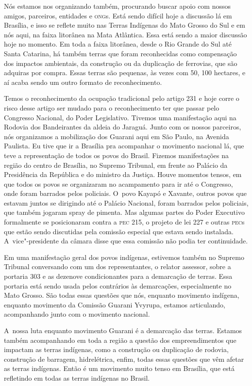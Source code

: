 Nós estamos nos organizando também, procurando buscar apoio com nossos
amigos, parceiros, entidades e \textsc{ong}s. Está sendo difícil hoje a
discussão lá em Brasília, e isso se reflete muito nas Terras Indígenas
do Mato Grosso do Sul e em nós aqui, na faixa litorânea na Mata Atlântica.
Essa está sendo a maior discussão hoje no momento. Em toda a faixa
litorânea, desde o Rio Grande do Sul até Santa Catarina, há também
terras que foram reconhecidas como compensação dos impactos ambientais,
da construção ou da duplicação de ferrovias, que são adquiras por
compra. Essas terras são pequenas, às vezes com 50, 100 hectares, e aí
acaba sendo um outro formato de reconhecimento.

Temos o reconhecimento da ocupação tradicional pelo artigo 231 e hoje
corre o risco desse artigo ser mudado para o reconhecimento ter que
passar pelo Congresso Nacional, do Poder Legislativo. Tivemos uma
manifestação aqui na Rodovia dos Bandeirantes da aldeia do Jaraguá.
Junto com os nossos parceiros, nós organizamos a mobilização dos
Guarani aqui em São Paulo, na Avenida Paulista. Eu tive que ir a
Brasília pra acompanhar o movimento nacional lá, que teve a
representação de todos os povos do Brasil. Fizemos manifestações na
região do centro de Brasília, no Supremo Tribunal, em frente ao Palácio
da Presidência da República e do ministro da Justiça. Houve momentos
tensos, em que todos os povos se organizaram no acampamento para ir até
o Congresso, onde foram barrados pelos policiais. O~povo Kayapó e
Xavante, outros povos que estavam juntos se dirigindo até o Palácio
Nacional, foram barrados pelos policiais, que também jogaram spray de
pimenta. Mas algumas partes do Poder Executivo formalmente se
posicionaram contra a \textsc{pec} 215, o projeto de lei 227 e outras \textsc{pec}s que
estão sendo discutidas pela comissão especial que estava sendo
instalada. A~vice"-presidente da câmara disse que essa comissão não
podia ter continuidade.

Em uma manifestação geral dos povos indígenas, estivemos também no
Supremo Tribunal conversando com um dos representantes, o relator
assessor, sobre a portaria 303 e as dezenove condicionantes para a
demarcação de terras. Essa portaria está sendo usada pelos contrários
às demarcações, especialmente no Mato Grosso. São todas essas questões
que nós, enquanto movimento indígena, enquanto movimento da Comissão
Guarani Yvyrupa, estamos articulando, acompanhando junto com o
movimento nacional.

A~nossa luta enquanto movimento Guarani é a demarcação das terras.
Estamos também acompanhando em toda a região a questão dos
empreendimentos que impactam as terras indígenas, como a construção ou
duplicação de rodovia, construção de barragem, hidrelétrica, enfim,
todas essas questões que vêm afetar as terras indígenas. Então é um
movimento muito tenso em Brasília, que está refletindo em todas as
terras indígenas no Brasil.

